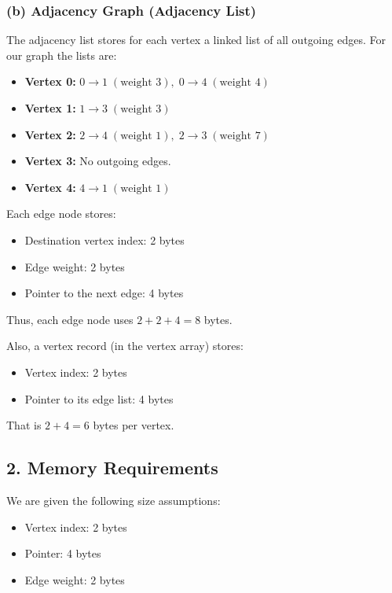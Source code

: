 \documentclass[11pt]{article}
\begin{document}
\subsubsection*{(b) Adjacency Graph (Adjacency List)}

The adjacency list stores for each vertex a linked list of all outgoing edges. For our graph the lists are:

\begin{itemize}
    \item \textbf{Vertex 0:} \(0 \to 1 \; (\text{weight }3),\; 0 \to 4 \; (\text{weight }4)\)
    \item \textbf{Vertex 1:} \(1 \to 3 \; (\text{weight }3)\)
    \item \textbf{Vertex 2:} \(2 \to 4 \; (\text{weight }1),\; 2 \to 3 \; (\text{weight }7)\)
    \item \textbf{Vertex 3:} No outgoing edges.
    \item \textbf{Vertex 4:} \(4 \to 1 \; (\text{weight }1)\)
\end{itemize}

Each edge node stores:
\begin{itemize}
    \item Destination vertex index: 2 bytes
    \item Edge weight: 2 bytes
    \item Pointer to the next edge: 4 bytes
\end{itemize}
Thus, each edge node uses \(2+2+4=8\) bytes.

Also, a vertex record (in the vertex array) stores:
\begin{itemize}
    \item Vertex index: 2 bytes
    \item Pointer to its edge list: 4 bytes
\end{itemize}
That is \(2+4=6\) bytes per vertex.



\subsection*{2. Memory Requirements}

We are given the following size assumptions:
\begin{itemize}
    \item Vertex index: 2 bytes
    \item Pointer: 4 bytes
    \item Edge weight: 2 bytes
\end{itemize}
\end{document}
